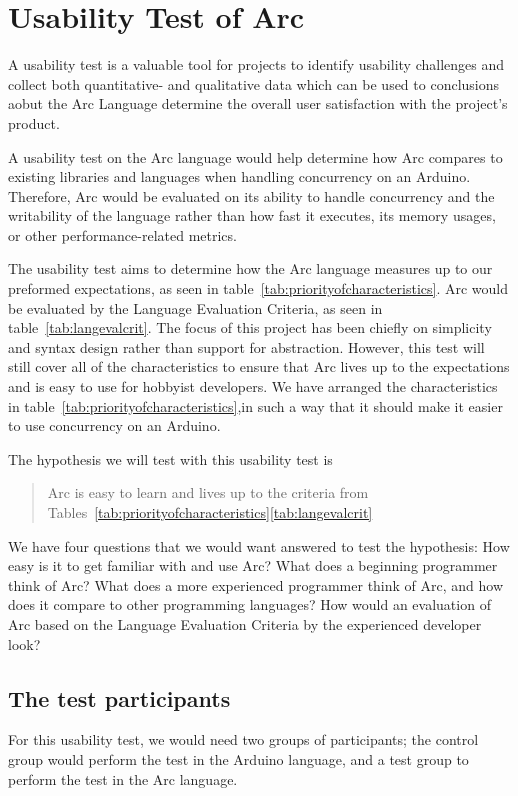 \section{Usability Test of Arc}\label{subsec:usabilityTestOfArc}
A usability test is a valuable tool for projects to identify usability challenges and collect both quantitative- and qualitative data which can be used to conclusions aobut the Arc Language
determine the overall user satisfaction with the project's product.

A usability test on the Arc language would help determine how Arc compares to existing libraries and languages when handling concurrency on an Arduino. Therefore, Arc would be evaluated on its ability to handle concurrency and the writability of the language rather than how fast it executes, its memory usages, or other performance-related metrics.

The usability test aims to determine how the Arc language measures up to our preformed expectations, as seen in table~\ref{tab:priorityofcharacteristics}. Arc would be evaluated by the Language Evaluation Criteria, as seen in table~\ref{tab:langevalcrit}. The focus of this project has been chiefly on simplicity and syntax design rather than support for abstraction. However, this test will still cover all of the characteristics to ensure that Arc lives up to the expectations and is easy to use for hobbyist developers. We have arranged the characteristics in table~\ref{tab:priorityofcharacteristics},in such a way that it should make it easier to use concurrency on an Arduino.

The hypothesis we will test with this usability test is 

\blockquote{Arc is easy to learn and lives up to the criteria from Tables~\ref{tab:priorityofcharacteristics}\ref{tab:langevalcrit}}

We have four questions that we would want answered to test the hypothesis: How easy is it to get familiar with and use Arc? What does a beginning programmer think of Arc? What does a more experienced programmer think of Arc, and how does it compare to other programming languages? How would an evaluation of Arc based on the Language Evaluation Criteria by the experienced developer look?

\subsection{The test participants}\label{subsubsec:theTestParticipants}
For this usability test, we would need two groups of participants; the control group would perform the test in the Arduino language, and a test group to perform the test in the Arc language.

